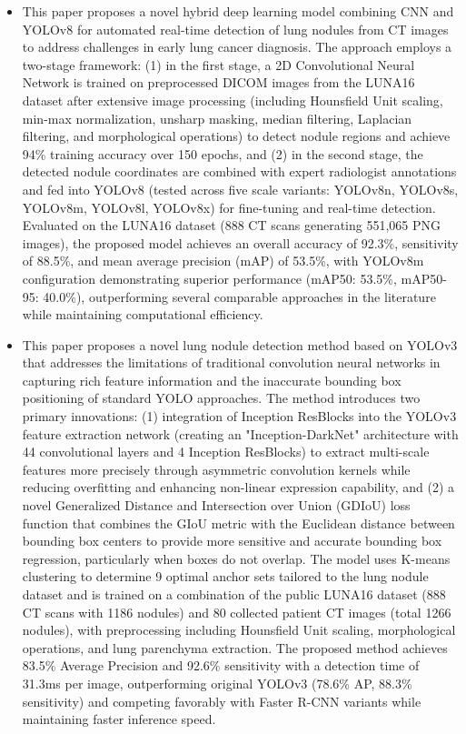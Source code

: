 \begin{itemize}
	\item This paper proposes a novel hybrid deep learning model combining CNN and YOLOv8 for automated real-time detection of lung nodules from CT images to address challenges in early lung cancer diagnosis. The approach employs a two-stage framework: (1) in the first stage, a 2D Convolutional Neural Network is trained on preprocessed DICOM images from the LUNA16 dataset after extensive image processing (including Hounsfield Unit scaling, min-max normalization, unsharp masking, median filtering, Laplacian filtering, and morphological operations) to detect nodule regions and achieve 94\% training accuracy over 150 epochs, and (2) in the second stage, the detected nodule coordinates are combined with expert radiologist annotations and fed into YOLOv8 (tested across five scale variants: YOLOv8n, YOLOv8s, YOLOv8m, YOLOv8l, YOLOv8x) for fine-tuning and real-time detection. Evaluated on the LUNA16 dataset (888 CT scans generating 551,065 PNG images), the proposed model achieves an overall accuracy of 92.3\%, sensitivity of 88.5\%, and mean average precision (mAP) of 53.5\%, with YOLOv8m configuration demonstrating superior performance (mAP50: 53.5\%, mAP50-95: 40.0\%), outperforming several comparable approaches in the literature while maintaining computational efficiency. \cite{article2}
	\item This paper proposes a novel lung nodule detection method based on YOLOv3 that addresses the limitations of traditional convolution neural networks in capturing rich feature information and the inaccurate bounding box positioning of standard YOLO approaches. The method introduces two primary innovations: (1) integration of Inception ResBlocks into the YOLOv3 feature extraction network (creating an "Inception-DarkNet" architecture with 44 convolutional layers and 4 Inception ResBlocks) to extract multi-scale features more precisely through asymmetric convolution kernels while reducing overfitting and enhancing non-linear expression capability, and (2) a novel Generalized Distance and Intersection over Union (GDIoU) loss function that combines the GIoU metric with the Euclidean distance between bounding box centers to provide more sensitive and accurate bounding box regression, particularly when boxes do not overlap. The model uses K-means clustering to determine 9 optimal anchor sets tailored to the lung nodule dataset and is trained on a combination of the public LUNA16 dataset (888 CT scans with 1186 nodules) and 80 collected patient CT images (total 1266 nodules), with preprocessing including Hounsfield Unit scaling, morphological operations, and lung parenchyma extraction. The proposed method achieves 83.5\% Average Precision and 92.6\% sensitivity with a detection time of 31.3ms per image, outperforming original YOLOv3 (78.6\% AP, 88.3\% sensitivity) and competing favorably with Faster R-CNN variants while maintaining faster inference speed. \cite{inproceedings1}

\end{itemize}
